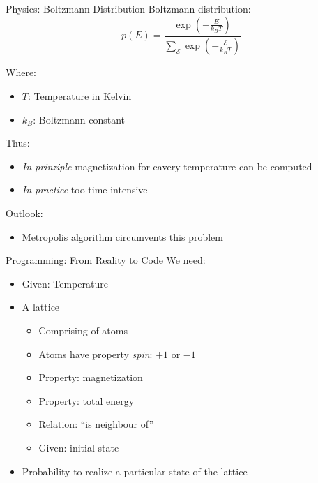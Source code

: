
\begin{frame}{Physics: Boltzmann Distribution}
%
Boltzmann distribution:
\[ p(E) = \frac
	{\exp( -\frac{E}{k_B T} )}
	{\sum_\mathcal{E} \exp( -\frac{\mathcal{E}}{k_B T} )}
\]

Where:
\begin{itemize}
\item $T$: Temperature in Kelvin
\item $k_B$: Boltzmann constant
\end{itemize}

Thus:
\begin{itemize}
\item \emph{In prinziple} magnetization for eavery temperature can be computed
\item \emph{In practice} too time intensive
\end{itemize}

Outlook:
\begin{itemize}
\item Metropolis algorithm circumvents this problem
\end{itemize}
%
\end{frame}


\begin{frame}{Programming: From Reality to Code}
%
We need:
\begin{itemize}
\item Given: Temperature
\item A lattice
	\begin{itemize}
	\item Comprising of atoms
	\item Atoms have property \emph{spin}: $+1$ or $-1$
	\item Property: magnetization
	\item Property: total energy
	\item Relation: \enquote{is neighbour of}
	\item Given: initial state
	\end{itemize}
\item Probability to realize a particular state of the lattice
\end{itemize}
%
\end{frame}


